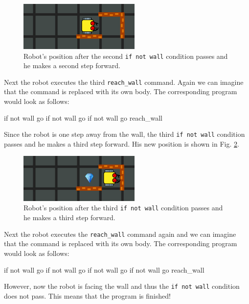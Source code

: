 \begin{figure}[!ht]
\begin{center}
\includegraphics[width=6cm]{imgk/rec-3.png}
\end{center}
\vspace{-4mm}
\caption{Robot's position after the second {\tt if not wall} condition passes and he makes a second step forward.}
\label{fig:rec3}
\vspace{-4mm}
\end{figure}
\noindent
Next the robot executes the third {\tt reach\_wall} command. Again we can imagine that the command 
is replaced with its own body. The corresponding program would look as follows:

\begin{bluecode}
if not wall
    go
    if not wall
        go
        if not wall
            go
            reach_wall
\end{bluecode}
\noindent
Since the robot is one step away from the wall, the third {\tt if not wall} condition passes and 
he makes a third step forward. His new position is shown in Fig. \ref{fig:rec4}.

\begin{figure}[!ht]
\begin{center}
\includegraphics[width=6cm]{imgk/rec-4.png}
\end{center}
\vspace{-4mm}
\caption{Robot's position after the third {\tt if not wall} condition passes and he makes a third step forward.}
\label{fig:rec4}
\end{figure}
\noindent
Next the robot executes the {\tt reach\_wall} command again and we can imagine that the command 
is replaced with its own body. The corresponding program would look as follows:

\begin{bluecode}
if not wall
    go
    if not wall
        go
        if not wall
            go
            if not wall
                go
                reach_wall
\end{bluecode}
\noindent
However, now the robot is facing the wall and thus the {\tt if not wall} condition does not pass.  
This means that the program is finished!

